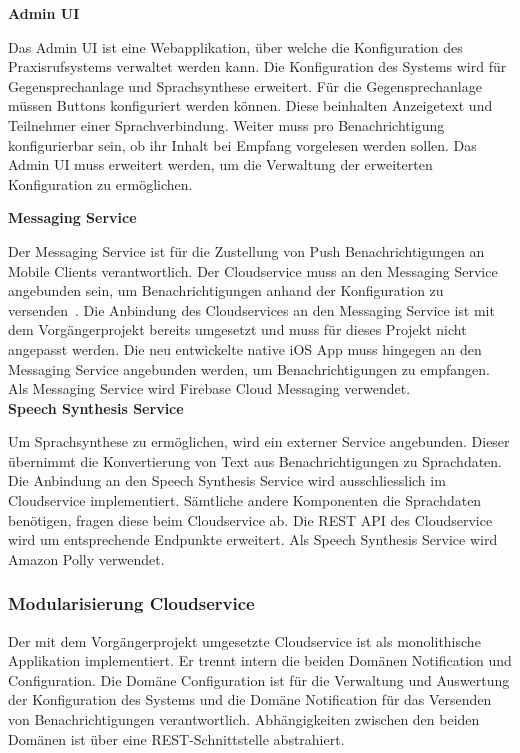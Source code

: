 \textbf{Admin UI}

Das Admin UI ist eine Webapplikation, über welche die Konfiguration des Praxisrufsystems verwaltet werden kann.
Die Konfiguration des Systems wird für Gegensprechanlage und Sprachsynthese erweitert.
Für die Gegensprechanlage müssen Buttons konfiguriert werden können.
Diese beinhalten Anzeigetext und Teilnehmer einer Sprachverbindung.
Weiter muss pro Benachrichtigung konfigurierbar sein, ob ihr Inhalt bei Empfang vorgelesen werden sollen.
Das Admin UI muss erweitert werden, um die Verwaltung der erweiterten Konfiguration zu ermöglichen.

\textbf{Messaging Service}

Der Messaging Service ist für die Zustellung von Push Benachrichtigungen an Mobile Clients verantwortlich.
Der Cloudservice muss an den Messaging Service angebunden sein, um Benachrichtigungen anhand der Konfiguration zu versenden~\cite{ip5}.
Die Anbindung des Cloudservices an den Messaging Service ist mit dem Vorgängerprojekt bereits umgesetzt und muss für dieses Projekt nicht angepasst werden.
Die neu entwickelte native iOS App muss hingegen an den Messaging Service angebunden werden, um Benachrichtigungen zu empfangen.
Als Messaging Service wird Firebase Cloud Messaging verwendet.
\\

\textbf{Speech Synthesis Service}

Um Sprachsynthese zu ermöglichen, wird ein externer Service angebunden.
Dieser übernimmt die Konvertierung von Text aus Benachrichtigungen zu Sprachdaten.
Die Anbindung an den Speech Synthesis Service wird ausschliesslich im Cloudservice implementiert.
Sämtliche andere Komponenten die Sprachdaten benötigen, fragen diese beim Cloudservice ab.
Die REST API des Cloudservice wird um entsprechende Endpunkte erweitert.
Als Speech Synthesis Service wird Amazon Polly verwendet.

\subsubsection{Modularisierung Cloudservice}

Der mit dem Vorgängerprojekt umgesetzte Cloudservice ist als monolithische Applikation implementiert.
Er trennt intern die beiden Domänen Notification und Configuration.
Die Domäne Configuration ist für die Verwaltung und Auswertung der Konfiguration des Systems und die Domäne Notification für das Versenden von Benachrichtigungen verantwortlich.
Abhängigkeiten zwischen den beiden Domänen ist über eine REST-Schnittstelle abstrahiert.

